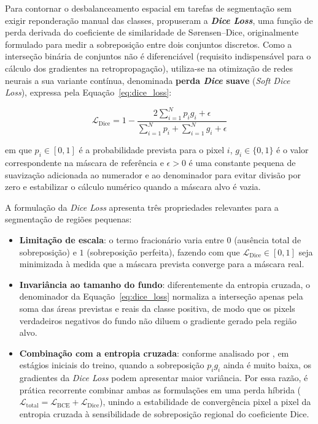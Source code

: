 
Para contornar o desbalanceamento espacial em tarefas de segmentação sem exigir
reponderação manual das classes,  propuseram a
\textbf{\textit{Dice Loss}}, uma função de perda derivada do coeficiente de similaridade
de Sørensen--Dice, originalmente formulado para medir a sobreposição entre dois conjuntos
discretos. Como a interseção binária de conjuntos não é diferenciável (requisito
indispensável para o cálculo dos gradientes na retropropagação), utiliza-se na otimização
de redes neurais a sua variante contínua, denominada \textbf{perda \textit{Dice} suave}
(\textit{Soft Dice Loss}), expressa pela Equação~\eqref{eq:dice_loss}:

\begin{equation}
    \label{eq:dice_loss}
    \mathcal{L}_{\text{Dice}} = 1 - \frac{2 \sum_{i=1}^{N} p_i g_i + \epsilon}{\sum_{i=1}^{N} p_i + \sum_{i=1}^{N} g_i + \epsilon}
\end{equation}

\noindent em que $p_i \in [0, 1]$ é a probabilidade prevista para o pixel $i$,
$g_i \in \{0, 1\}$ é o valor correspondente na máscara de referência e $\epsilon > 0$ é
uma constante pequena de suavização adicionada ao numerador e ao denominador para evitar
divisão por zero e estabilizar o cálculo numérico quando a máscara alvo é vazia.

A formulação da \textit{Dice Loss} apresenta três propriedades relevantes para a
segmentação de regiões pequenas:

\begin{itemize}
    \item \textbf{Limitação de escala}: o termo fracionário varia entre $0$ (ausência
    total de sobreposição) e $1$ (sobreposição perfeita), fazendo com que
    $\mathcal{L}_{\text{Dice}} \in [0, 1]$ seja minimizada à medida que a máscara
    prevista converge para a máscara real.
    \item \textbf{Invariância ao tamanho do fundo}: diferentemente da entropia cruzada, o
    denominador da Equação~\eqref{eq:dice_loss} normaliza a interseção apenas pela soma
    das áreas previstas e reais da classe positiva, de modo que os pixels verdadeiros
    negativos do fundo não diluem o gradiente gerado pela região alvo.
    \item \textbf{Combinação com a entropia cruzada}: conforme analisado por
    , em estágios iniciais do treino, quando a sobreposição
    $p_i g_i$ ainda é muito baixa, os gradientes da \textit{Dice Loss} podem apresentar
    maior variância. Por essa razão, é prática recorrente combinar ambas as formulações em
    uma perda híbrida ($\mathcal{L}_{\text{total}} = \mathcal{L}_{\text{BCE}} +
    \mathcal{L}_{\text{Dice}}$), unindo a estabilidade de convergência pixel a pixel da
    entropia cruzada à sensibilidade de sobreposição regional do coeficiente Dice.
\end{itemize}